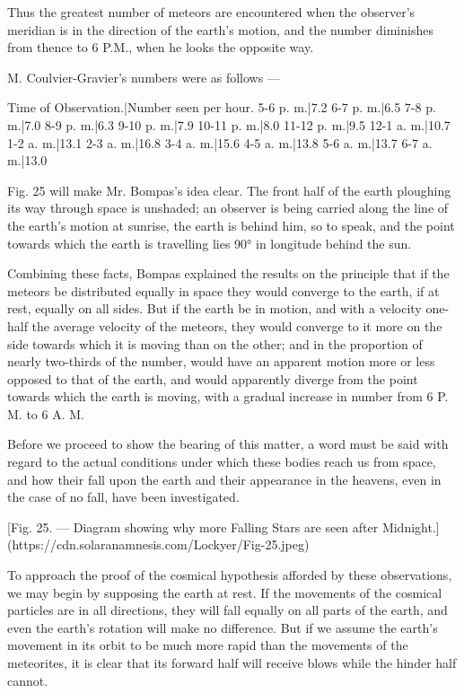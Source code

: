 \documentclass[a4paper, 12pt, oneside, polutonikogreek, english]{article}
\begin{document}
Thus the greatest number of meteors are encountered when the observer's meridian is in the direction of the earth's motion, and the number diminishes from thence to 6 P.M., when he looks the opposite way.

M. Coulvier-Gravier's numbers were as follows ---

Time of Observation.|Number seen per hour. 
5-6 p. m.|7.2 
6-7 p. m.|6.5 
7-8 p. m.|7.0 
8-9 p. m.|6.3 
9-10 p. m.|7.9 
10-11 p. m.|8.0 
11-12 p. m.|9.5 
12-1 a. m.|10.7 
1-2 a. m.|13.1 
2-3 a. m.|16.8 
3-4 a. m.|15.6 
4-5 a. m.|13.8 
5-6 a. m.|13.7 
6-7 a. m.|13.0

Fig. 25 will make Mr. Bompas's idea clear. The front half of the earth ploughing its way through space is unshaded; an observer is being carried along the line of the earth's motion at sunrise, the earth is behind him, so to speak, and the point towards which the earth is travelling lies 90° in longitude behind the sun.

Combining these facts, Bompas explained the results on the principle that if the meteors be distributed equally in space they would converge to the earth, if at rest, equally on all sides. But if the earth be in motion, and with a velocity one-half the average velocity of the meteors, they would converge to it more on the side towards which it is moving than on the other; and in the proportion of nearly two-thirds of the number, would have an apparent motion more or less opposed to that of the earth, and would apparently diverge from the point towards which the earth is moving, with a gradual increase in number from 6 P. M. to 6 A. M.

Before we proceed to show the bearing of this matter, a word must be said with regard to the actual conditions under which these bodies reach us from space, and how their fall upon the earth and their appearance in the heavens, even in the case of no fall, have been investigated.

[Fig. 25. --- Diagram showing why more Falling Stars are seen after Midnight.](https://cdn.solaranamnesis.com/Lockyer/Fig-25.jpeg)

To approach the proof of the cosmical hypothesis afforded by these observations, we may begin by supposing the earth at rest. If the movements of the cosmical particles are in all directions, they will fall equally on all parts of the earth, and even the earth's rotation will make no difference. But if we assume the earth's movement in its orbit to be much more rapid than the movements of the meteorites, it is clear that its forward half will receive blows while the hinder half cannot.
\end{document}
